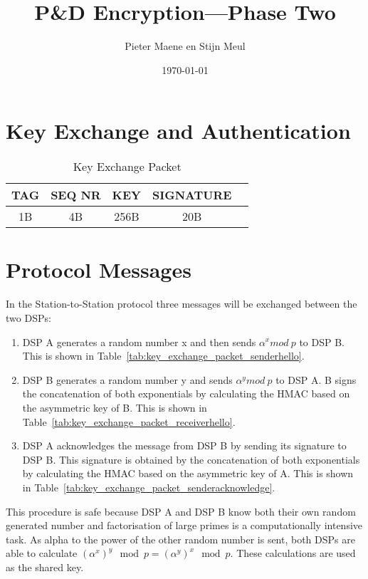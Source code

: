 \documentclass[a4paper]{article}
\title{P\&D Encryption---Phase Two}
\author{Pieter Maene en Stijn Meul}
\date{\today}
\begin{document}
\maketitle

\section{Key Exchange and Authentication}

\begin{table}[H]
    \begin{center}
        \begin{tabular}{| c | c | c | c | c |}
            \hline
            TAG & SEQ NR & KEY & SIGNATURE \\ \hline
            1B & 4B & 256B & 20B \\
            \hline
        \end{tabular}
    \end{center}
    
    \caption{Key Exchange Packet}
    \label{tab:key_exchange_packet}
\end{table}

\section{Protocol Messages}
In the Station-to-Station protocol three messages will be exchanged between the two DSPs:

\begin{enumerate}
 \item DSP A generates a random number x and then sends $\alpha^x mod\ p$ to DSP B. This is shown in Table~\ref{tab:key_exchange_packet_senderhello}.
 \item DSP B generates a random number y and sends $\alpha^y mod\ p$ to DSP A. B signs the concatenation of both exponentials by calculating the HMAC based on the asymmetric key of B. This is shown in Table~\ref{tab:key_exchange_packet_receiverhello}.
 \item DSP A acknowledges the message from DSP B by sending its signature to DSP B. This signature is obtained by the concatenation of both exponentials by calculating the HMAC based on the asymmetric key of A. This is shown in Table~\ref{tab:key_exchange_packet_senderacknowledge}.
\end{enumerate}
This procedure is safe because DSP A and DSP B know both their own random generated number and factorisation of large primes is a computationally intensive task. As alpha to the power of the other random number is sent, both DSPs are able to calculate $\left(\alpha^{x}\right)^{y}\mod{p} = \left(\alpha^{y}\right)^{x}\mod{p}$. These calculations are used as the shared key.
\end{document}
